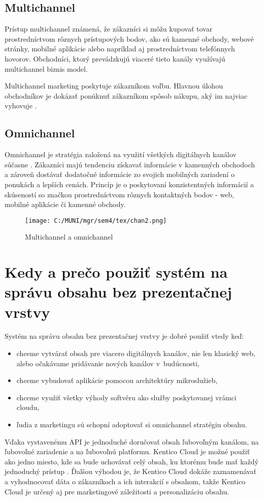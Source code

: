 \documentclass[
  printed, %
  table,   %
  lof,     %
  nolot,     %
  twoside,  
]{fithesis3}
\begin{document}
\subsection{Multichannel}
Prístup multichannel známená, že zákazníci si môžu kupovať tovar prostredníctvom rôznych prístupových bodov, ako sú kamenné obchody, webové stránky, mobilné aplikácie alebo napríklad aj prostredníctvom telefónnych hovorov. Obchodníci, ktorý prevádzkujú viaceré tieto kanály využívajú multichannel biznis model.

Multichannel marketing poskytuje zákazníkom voľbu. Hlavnou úlohou obchodníkov je dokázať ponúknuť zákazníkom spôsob nákupu, aký im najviac vyhovuje \cite{multi}.
\subsection{Omnichannel}
Omnichannel je stratégia založená na využití všetkých digitálnych kanálov súčasne \cite{omni}. Zákazníci majú tendenciu získavať informácie v kamenných obchodoch a zároveň dostávať dodatočné informácie zo svojich mobilných zariadení o ponukách a lepších cenách. Princíp je o poskytovaní konzistentných informácií a skúseností so značkou prostredníctvom rôznych kontaktných bodov - web, mobilné aplikácie či kamenné obchody.

\begin{figure}[h]
  \begin{center}
        \texttt{[image: C:/MUNI/mgr/sem4/tex/chan2.png]}
  \end{center}
  \caption{Multichannel a omnichannel \cite{chan}}
  \label{fig:channels}
\end{figure}

\section{Kedy a prečo použiť systém na správu obsahu bez prezentačnej vrstvy}
Systém na správu obsahu bez prezentačnej vrstvy je dobré použiť vtedy keď:
\begin{itemize}
	\item chceme vytvárať obsah pre viacero digitálnych kanálov, nie len klasický web, alebo očakávame pridávanie nových kanálov v~budúcnosti,
	\item chceme vybudovať aplikácie pomocou architektúry mikro\-služieb,
	\item chceme využiť všetky výhody softvéru ako služby poskytovanej vrámci cloudu,
	\item ľudia z marketingu sú schopní adoptovať si omnichannel stratégiu obsahu.
\end{itemize}
Vďaka vystavenému API je jednoduché doručovať obsah ľubovoľným kanálom, na ľubovoľné zariadenie a na ľubovoľnú platformu. Kentico Cloud je možné použiť ako jedno miesto, kde sa bude uchovávať celý obsah, ku ktorému bude mať každý jednoduchý prístup \cite{cmsGuide}.
Ďalšou výhodou je, že Kentico Cloud dokáže zaznamenávať a vyhodnocovať dáta o zákazníkoch a ich interakcií s obsahom, takže Kentico Cloud je určený aj pre marketingové záležitosti a personalizáciu obsahu.
\end{document}
